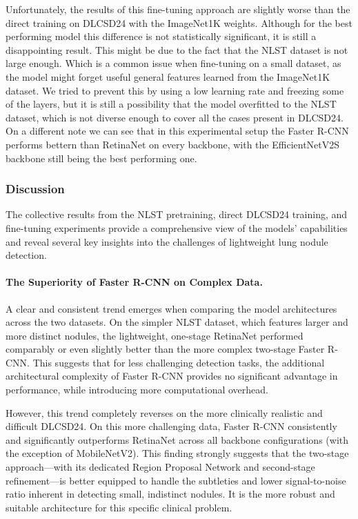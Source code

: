 

Unfortunately, the results of this fine-tuning approach are slightly worse than the direct training on DLCSD24 with the ImageNet1K weights. Although for the best performing model this difference is not statistically significant, it is still a disappointing result.
This might be due to the fact that the NLST dataset is not large enough. Which is a common issue when fine-tuning on a small dataset, as the model might forget useful general features learned from the ImageNet1K dataset.
We tried to prevent this by using a low learning rate and freezing some of the layers, but it is still a possibility that the model overfitted to the NLST dataset, which is not diverse enough to cover all the cases present in DLCSD24.
On a different note we can see that in this experimental setup the Faster R-CNN performs bettern than RetinaNet on every backbone, with the EfficientNetV2S backbone still being the best performing one.

\subsubsection{Discussion}

The collective results from the NLST pretraining, direct DLCSD24 training, and fine-tuning experiments provide a comprehensive view of the models' capabilities and reveal several key insights into the challenges of lightweight lung nodule detection.

\paragraph{The Superiority of Faster R-CNN on Complex Data.}
A clear and consistent trend emerges when comparing the model architectures across the two datasets. On the simpler NLST dataset, which features larger and more distinct nodules, the lightweight, one-stage RetinaNet performed comparably or even slightly better than the more complex two-stage Faster R-CNN. This suggests that for less challenging detection tasks, the additional architectural complexity of Faster R-CNN provides no significant advantage in performance, while introducing more computational overhead.

However, this trend completely reverses on the more clinically realistic and difficult DLCSD24. On this more challenging data, Faster R-CNN consistently and significantly outperforms RetinaNet across all backbone configurations (with the exception of MobileNetV2). This finding strongly suggests that the two-stage approach—with its dedicated Region Proposal Network and second-stage refinement—is better equipped to handle the subtleties and lower signal-to-noise ratio inherent in detecting small, indistinct nodules. It is the more robust and suitable architecture for this specific clinical problem.

